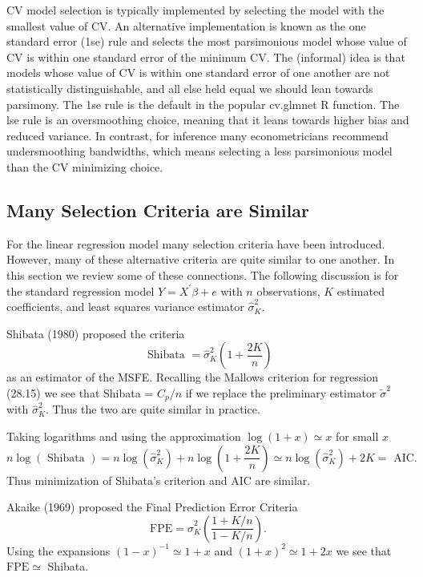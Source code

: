 \documentclass[10pt]{article}
\begin{document}
CV model selection is typically implemented by selecting the model with the smallest value of CV. An alternative implementation is known as the one standard error (1se) rule and selects the most parsimonious model whose value of CV is within one standard error of the minimum CV. The (informal) idea is that models whose value of $\mathrm{CV}$ is within one standard error of one another are not statistically distinguishable, and all else held equal we should lean towards parsimony. The 1se rule is the default in the popular cv.glmnet R function. The lse rule is an oversmoothing choice, meaning that it leans towards higher bias and reduced variance. In contrast, for inference many econometricians recommend undersmoothing bandwidths, which means selecting a less parsimonious model than the CV minimizing choice.

\subsection{Many Selection Criteria are Similar}
For the linear regression model many selection criteria have been introduced. However, many of these alternative criteria are quite similar to one another. In this section we review some of these connections. The following discussion is for the standard regression model $Y=X^{\prime} \beta+e$ with $n$ observations, $K$ estimated coefficients, and least squares variance estimator $\widehat{\sigma}_{K}^{2}$.

Shibata (1980) proposed the criteria
$$
\text { Shibata }=\widehat{\sigma}_{K}^{2}\left(1+\frac{2 K}{n}\right)
$$
as an estimator of the MSFE. Recalling the Mallows criterion for regression (28.15) we see that Shibata = $C_{p} / n$ if we replace the preliminary estimator $\widetilde{\sigma}^{2}$ with $\widehat{\sigma}_{K}^{2}$. Thus the two are quite similar in practice.

Taking logarithms and using the approximation $\log (1+x) \simeq x$ for small $x$
$$
n \log (\text { Shibata })=n \log \left(\widehat{\sigma}_{K}^{2}\right)+n \log \left(1+\frac{2 K}{n}\right) \simeq n \log \left(\widehat{\sigma}_{K}^{2}\right)+2 K=\text { AIC. }
$$
Thus minimization of Shibata's criterion and AIC are similar.

Akaike (1969) proposed the Final Prediction Error Criteria
$$
\mathrm{FPE}=\widehat{\sigma}_{K}^{2}\left(\frac{1+K / n}{1-K / n}\right) .
$$
Using the expansions $(1-x)^{-1} \simeq 1+x$ and $(1+x)^{2} \simeq 1+2 x$ we see that $\mathrm{FPE} \simeq$ Shibata.
\end{document}
